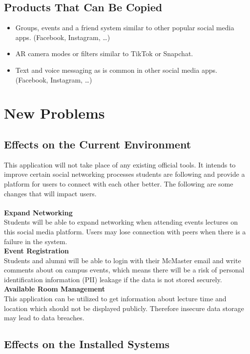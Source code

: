 \documentclass[12pt]{article}
\begin{document}
\subsection{Products That Can Be Copied}
\begin{itemize}
  \item Groups, events and a friend system similar to other popular social media apps. (Facebook, Instagram, \dots)
  \item AR camera modes or filters similar to TikTok or Snapchat.
  \item Text and voice messaging as is common in other social media apps. (Facebook, Instagram, \dots)
\end{itemize}
\section{New Problems}
\subsection{Effects on the Current Environment}

This application will not take place of any existing official tools. It intends to improve certain social networking processes students are following and provide a platform for users to connect with each other better. The following are some changes that will impact users.\\
\noindent\\
\textbf{Expand Networking}\\
Students will be able to expand networking when attending events lectures on this social media platform. Users may lose connection with peers when there is a failure in the system. 
\noindent\\
\textbf{Event Registration}\\
Students and alumni will be able to login with their McMaster email and write comments about on campus events, which means there will be a risk of personal identification information (PII) leakage if the data is not stored securely.
\noindent\\
\textbf{Available Room Management}\\
This application can be utilized to get information about lecture time and location which should not be displayed publicly. Therefore insecure data storage may lead to data breaches.

\subsection{Effects on the Installed Systems}
\end{document}
